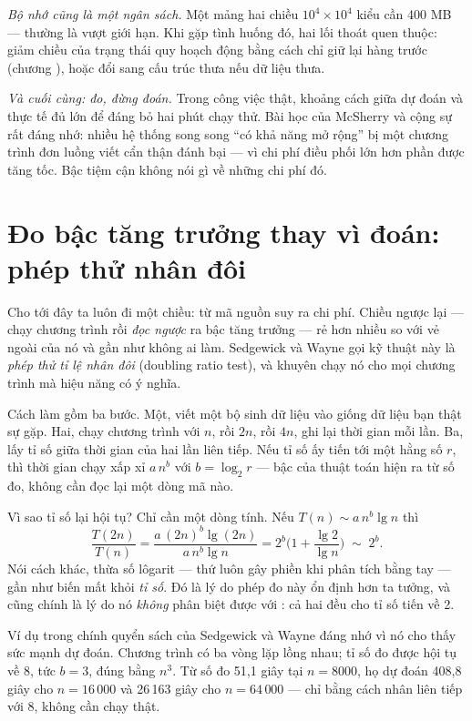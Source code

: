 \documentclass[../../algorithm.tex]{subfiles}
\begin{document}
\emph{Bộ nhớ cũng là một ngân sách.} Một mảng hai chiều \(10^4 \times 10^4\) kiểu  cần 400 MB --- thường là vượt giới hạn. Khi gặp tình huống đó, hai lối thoát quen thuộc: giảm chiều của trạng thái quy hoạch động bằng cách chỉ giữ lại hàng trước (chương ), hoặc đổi sang cấu trúc thưa nếu dữ liệu thưa.

\emph{Và cuối cùng: đo, đừng đoán.} Trong công việc thật, khoảng cách giữa dự đoán và thực tế đủ lớn để đáng bỏ hai phút chạy thử. Bài học của McSherry và cộng sự\cite{mcsherry2015} rất đáng nhớ: nhiều hệ thống song song ``có khả năng mở rộng'' bị một chương trình đơn luồng viết cẩn thận đánh bại --- vì chi phí điều phối lớn hơn phần được tăng tốc. Bậc tiệm cận không nói gì về những chi phí đó.

\section{Đo bậc tăng trưởng thay vì đoán: phép thử nhân đôi}

Cho tới đây ta luôn đi một chiều: từ mã nguồn suy ra chi phí. Chiều ngược lại --- chạy chương trình rồi \emph{đọc ngược} ra bậc tăng trưởng --- rẻ hơn nhiều so với vẻ ngoài của nó và gần như không ai làm. Sedgewick và Wayne gọi kỹ thuật này là \emph{phép thử tỉ lệ nhân đôi} (doubling ratio test), và khuyên chạy nó cho mọi chương trình mà hiệu năng có ý nghĩa\cite{sedgewick2011}.

Cách làm gồm ba bước. Một, viết một bộ sinh dữ liệu vào giống dữ liệu bạn thật sự gặp. Hai, chạy chương trình với \(n\), rồi \(2n\), rồi \(4n\), ghi lại thời gian mỗi lần. Ba, lấy tỉ số giữa thời gian của hai lần liên tiếp. Nếu tỉ số ấy tiến tới một hằng số \(r\), thì thời gian chạy xấp xỉ \(a\,n^{b}\) với \(b = \log_2 r\) --- bậc của thuật toán hiện ra từ số đo, không cần đọc lại một dòng mã nào.

Vì sao tỉ số lại hội tụ? Chỉ cần một dòng tính. Nếu \(T(n)\sim a\,n^{b}\lg n\) thì
\[\frac{T(2n)}{T(n)}=\frac{a\,(2n)^{b}\lg (2n)}{a\,n^{b}\lg n}=2^{b}\Big(1+\frac{\lg 2}{\lg n}\Big)\;\sim\;2^{b}.\]
Nói cách khác, thừa số lôgarit --- thứ luôn gây phiền khi phân tích bằng tay --- gần như biến mất khỏi \emph{tỉ số}. Đó là lý do phép đo này ổn định hơn ta tưởng, và cũng chính là lý do nó \emph{không} phân biệt được  với : cả hai đều cho tỉ số tiến về 2.

Ví dụ trong chính quyển sách của Sedgewick và Wayne đáng nhớ vì nó cho thấy sức mạnh dự đoán. Chương trình  có ba vòng lặp lồng nhau; tỉ số đo được hội tụ về 8, tức \(b = 3\), đúng bằng \(n^3\). Từ số đo 51,1 giây tại \(n = 8000\), họ dự đoán 408,8 giây cho \(n = 16\,000\) và 26\,163 giây cho \(n = 64\,000\) --- chỉ bằng cách nhân liên tiếp với 8, không cần chạy thật.
\end{document}
